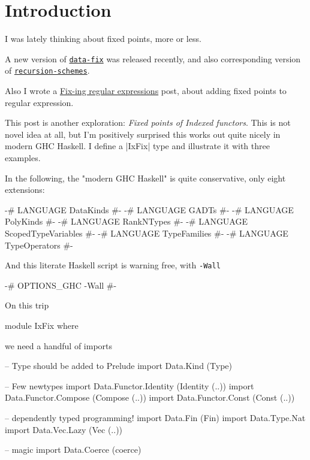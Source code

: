 \section{Introduction}

I was lately thinking about fixed points, more or less.

A new version of 
\href{https://hackage.haskell.org/package/data-fix}{\texttt{data-fix}}
was released recently, and also corresponding version
of \href{https://hackage.haskell.org/package/recursion-schemes}{\texttt{recursion-schemes}}.

Also I wrote a \href{https://www.well-typed.com/blog/2020/06/fix-ing-regular-expressions/}{Fix-ing regular expressions} post,
about adding fixed points to regular expression.

This post is another exploration: \emph{Fixed points of Indexed functors}.
This is not novel idea at all,
but I'm positively surprised this works out quite nicely in modern GHC Haskell.
I define a |IxFix| type and illustrate it with three examples.

In the following, the "modern GHC Haskell" is quite conservative,
only eight extensions:

\begin{code}
{-# LANGUAGE DataKinds #-}
{-# LANGUAGE GADTs #-}
{-# LANGUAGE PolyKinds #-}
{-# LANGUAGE RankNTypes #-}
{-# LANGUAGE ScopedTypeVariables #-}
{-# LANGUAGE TypeFamilies #-}
{-# LANGUAGE TypeOperators #-}
\end{code}

And this literate Haskell script is warning free, with \texttt{-Wall}
\begin{code}
{-# OPTIONS_GHC -Wall #-}
\end{code}

On this trip
\begin{code}
module IxFix where
\end{code}

we need a handful of imports

\begin{code}
-- Type should be added to Prelude
import Data.Kind (Type)

-- Few newtypes
import Data.Functor.Identity (Identity (..))
import Data.Functor.Compose (Compose (..))
import Data.Functor.Const (Const (..))

-- dependently typed programming!
import Data.Fin      (Fin)
import Data.Type.Nat
import Data.Vec.Lazy (Vec (..))

-- magic
import Data.Coerce (coerce)
\end{code}

